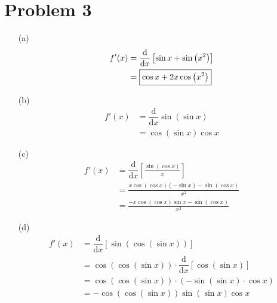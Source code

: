 \documentclass{article}
\newcommand*{\paren}[1]{\ensuremath\left(#1\right)}
\newcommand*{\problem}[1]{\section*{Problem #1}}
\newcommand*{\deriv}[1][x]{\ensuremath{\dfrac{\mathrm{d}}{\mathrm{d}#1}}}
\newcommand*{\Deriv}[2][x]{\ensuremath{\dfrac{\mathrm{d}}{\mathrm{d}#1}\left[#2\right]}}
\begin{document}
\problem{3}
\begin{multicols}{2}
	\allowdisplaybreaks[0]
	\begin{itemize}
		\item[(a)]
		\begin{align*}
			f'(x)&=\Deriv{\sin x+\sin\paren{x^2}} \\
			&=\boxed{\cos x+2x\cos\paren{x^2}}
		\end{align*}

		\item[(b)]
		\begin{align*}
			f'(x)&=\deriv\sin(\sin x) \\
			&=\boxed{\cos(\sin x)\cos x}
		\end{align*}

		\item[(c)]
		\begin{align*}
			f'(x)&=\Deriv{\frac{\sin(\cos x)}{x}} \\
			&=\frac{x\cos(\cos x)(-\sin x)-\sin(\cos x)}{x^2} \\
			&=\boxed{\frac{-x\cos(\cos x)\sin x-\sin(\cos x)}{x^2}}
		\end{align*}

		\item[(d)]
		\begin{align*}
			f'(x)&=\Deriv{\sin(\cos(\sin x))} \\
			&=\cos(\cos(\sin x))\cdot\Deriv{\cos(\sin x)} \\
			&=\cos(\cos(\sin x))\cdot(-\sin(\sin x)\cdot\cos x) \\
			&=\boxed{-\cos(\cos(\sin x))\sin(\sin x)\cos x}
		\end{align*}
	\end{itemize}
	\allowdisplaybreaks
\end{multicols}
\end{document}
